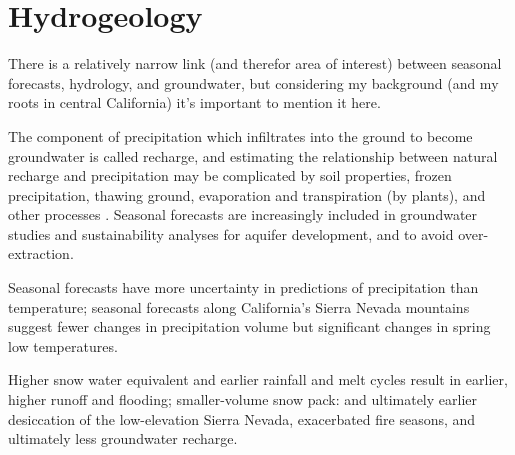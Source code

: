 %
%
\section{Hydrogeology}

There is a relatively narrow link (and therefor area of interest) between seasonal forecasts, hydrology, and groundwater, but considering my background (and my roots in central California) it's important to mention it here. 

The component of precipitation which infiltrates into the ground to become groundwater is called \gls{recharge}, and estimating the relationship between natural recharge and precipitation may be complicated by soil properties, frozen precipitation, thawing ground, evaporation and transpiration (by plants), and other processes \autocite{fetter1994applied}. Seasonal forecasts are increasingly included in groundwater studies and sustainability analyses for aquifer development, and to avoid over-extraction. %

Seasonal forecasts have more uncertainty in predictions of precipitation than temperature; seasonal forecasts along California's Sierra Nevada mountains suggest fewer changes in precipitation volume but significant changes in spring low temperatures.

Higher snow water equivalent and earlier rainfall and melt cycles result in earlier, higher runoff and flooding; smaller-volume snow pack: and ultimately earlier desiccation of the low-elevation Sierra Nevada, exacerbated fire seasons, and ultimately less groundwater recharge. \autocite{guan20132010} 






